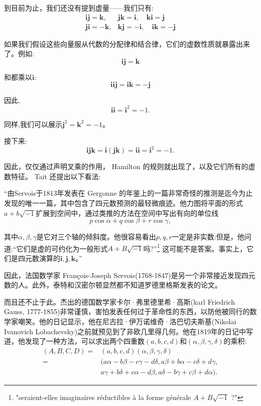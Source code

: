 到目前为止，我们还没有提到虚量——我们只有:
$$
\begin{array}{ll}
\mathbf{i j}=\mathbf{k}, & \mathbf{j} \mathbf{k}=\mathbf{i}, \quad \mathbf{k i}=\mathbf{j} \\
\mathbf{j} \mathbf{i}=-\mathbf{k}, & \mathbf{k j}=-\mathbf{i}, \quad \mathbf{i k}=-\mathbf{j}
\end{array}
$$

如果我们假设这些向量服从代数的分配律和结合律，它们的虚数性质就暴露出来了。例如:
$$
\mathbf{i j}=\mathbf{k}
$$

和都乘以$\mathbf{i}$:
$$
\mathbf{i}\mathbf{i} \mathbf{j}=\mathbf{i k}=-\mathbf{j}
$$

因此,
$$
\mathbf{i i}=\mathbf{i}^{2}=-1 .
$$

同样,我们可以展示$\mathbf{j}^{2}=\mathbf{k}^{2}=-1$。

接下来:
$$
\mathbf{i j k}=\mathbf{i}(\mathbf{j k})=\mathbf{i} \mathbf{i}=\mathbf{i}^{2}=-1 .
$$

因此，仅仅通过声明叉乘的作用， Hamilton 的规则就出现了，以及它们所有的虚数特征。 Tait 还提出以下看法:

\begin{CJK}{UTF8}{gkai}
    “由Servois于1813年发表在 Gergonne 的年鉴上的一篇非常奇怪的推测是迄今为止发现的唯一一篇，其中包含了四元数预测的最轻微痕迹。他力图将平面的形式$a+b \sqrt{-1}$扩展到空间中，通过类推的方法在空间中写出有向的单位线
$$
p \cos \alpha+q \cos \beta+r \cos \gamma,
$$

其中$\alpha, \beta, \gamma$是它对三个轴的倾斜度。他很容易看出$p, q, r$一定是非实数:但是，他问道:“它们是虚的可约化为一般形式$A+B \sqrt{-1}$吗?”\footnote{"seraient-elles imaginaires réductibles à la forme générale $A+B \sqrt{-1}$ ?"} 这可能不是答案。事实上，它们是四元数演算的$\mathbf{i}, \mathbf{j}, \mathbf{k}$。”
\end{CJK}

因此，法国数学家 François-Joseph Servois(1768-1847)是另一个非常接近发现四元数的人。此外，泰特和汉密尔顿显然都不知道罗德里格斯发表的论文。

而且还不止于此。杰出的德国数学家卡尔·弗里德里希·高斯(karl Friedrich Gauss, 1777-1855)非常谨慎，害怕发表任何过于革命性的东西，以防他被同行的数学家嘲笑。他的日记显示，他在尼古拉·伊万诺维奇·洛巴切夫斯基(Nikolai Ivanovich Lobachevsky)之前就预见到了非欧几里得几何。他在1819年的日记中写道，他发现了一种方法，可以求出两个四重数$(a, b, c, d)$和$(\alpha, \beta, \gamma, \delta)$的乘积:
$$
\begin{aligned}
(A, B, C, D)= & (a, b, c, d)(\alpha, \beta, \gamma, \delta) \\
= & (a \alpha-b \beta-c \gamma-d \delta, a \beta+b \alpha-c \delta+d \gamma, \\
& a \gamma+b \delta+c \alpha-d \beta, a \delta-b \gamma+c \beta+d \alpha) .
\end{aligned}
$$

